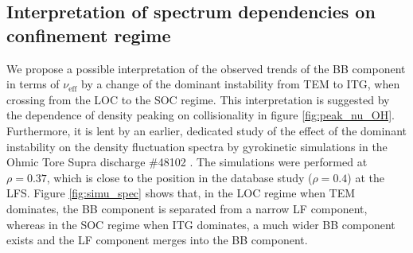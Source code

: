 \subsection{Interpretation of spectrum dependencies on confinement regime}

We propose a possible interpretation of the observed trends of the BB component in terms of $\nu_\mathrm{eff}$ by a change of the dominant instability from TEM to ITG, when crossing from the LOC to the SOC regime. This interpretation is suggested by the dependence of density peaking on collisionality in figure \ref{fig:peak_nu_OH}. Furthermore, it is lent by an earlier, dedicated study of the effect of the dominant instability on the density fluctuation spectra by gyrokinetic simulations in the Ohmic Tore Supra discharge \#48102 \cite{Arnichand_2016_PPCF,Citrin_2017_PPCF}. The simulations were performed at $\rho = 0.37$, which is close to the position in the database study ($\rho = 0.4$) at the LFS. Figure \ref{fig:simu_spec} shows that, in the LOC regime when TEM dominates, the BB component is separated from a narrow LF component, whereas in the SOC regime when ITG dominates, a much wider BB component exists and the LF component merges into the BB component.


